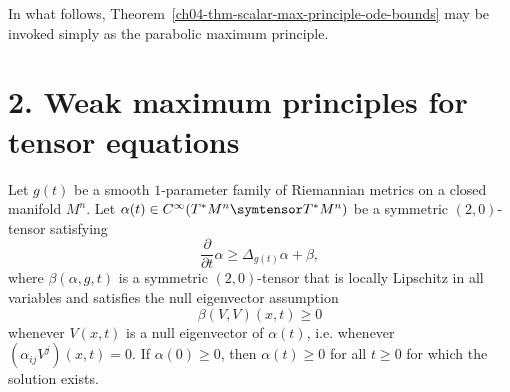 \begin{remark}
\label{ch04-rem-use-parabolic-maximum-principle}

In what follows, Theorem~\ref{ch04-thm-scalar-max-principle-ode-bounds} may be invoked simply as the parabolic maximum principle.
\end{remark}

\section*{2. Weak maximum principles for tensor equations}

\begin{theorem}
\label{ch04-thm-tensor-max-principle-nonnegativity}

Let \(g(t)\) be a smooth \(1\)-parameter family of Riemannian metrics on a closed manifold \(M^n\). Let \(\alpha(t)\in C^\infty(T^*M^n \symtensor T^*M^n)\) be a symmetric \((2,0)\)-tensor satisfying
\[
\frac{\partial}{\partial t}\alpha \ge \Delta_{g(t)}\alpha+\beta,
\]
where \(\beta(\alpha,g,t)\) is a symmetric \((2,0)\)-tensor that is locally Lipschitz in all variables and satisfies the null eigenvector assumption
\[
\beta(V,V)(x,t)\ge 0
\]
whenever \(V(x,t)\) is a null eigenvector of \(\alpha(t)\), i.e. whenever \((\alpha_{ij}V^j)(x,t)=0\). If \(\alpha(0)\ge 0\), then \(\alpha(t)\ge 0\) for all \(t\ge 0\) for which the solution exists.
\end{theorem}

